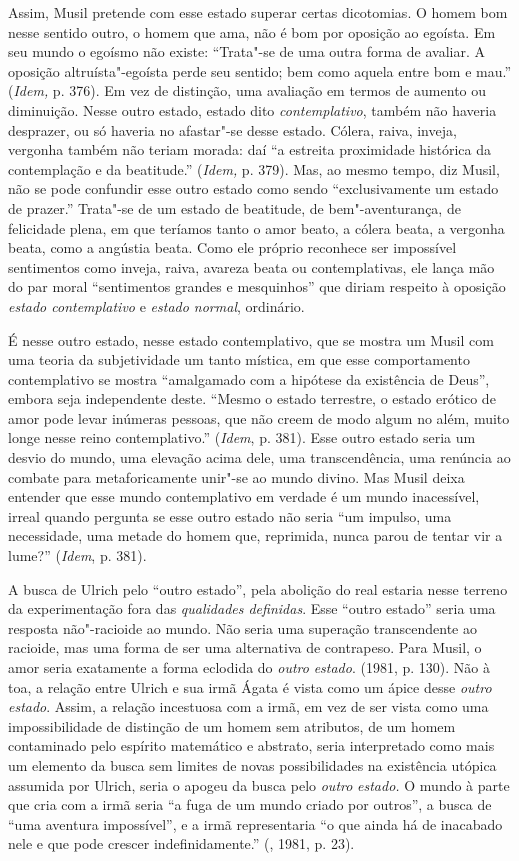 Assim, Musil pretende com esse estado superar certas dicotomias. O homem
bom nesse sentido outro, o homem que ama, não é bom por oposição ao
egoísta. Em seu mundo o egoísmo não existe: ``Trata"-se de uma outra
forma de avaliar. A oposição altruísta"-egoísta perde seu sentido; bem
como aquela entre bom e mau.'' (\emph{Idem,} p. 376). Em vez de
distinção, uma avaliação em termos de aumento ou diminuição. Nesse outro
estado, estado dito \emph{contemplativo}, também não haveria desprazer,
ou só haveria no afastar"-se desse estado. Cólera, raiva, inveja,
vergonha também não teriam morada: daí ``a estreita proximidade
histórica da contemplação e da beatitude.'' (\emph{Idem,} p. 379). Mas,
ao mesmo tempo, diz Musil, não se pode confundir esse outro estado como
sendo ``exclusivamente um estado de prazer.'' Trata"-se de um estado de
beatitude, de bem"-aventurança, de felicidade plena, em que teríamos
tanto o amor beato, a cólera beata, a vergonha beata, como a angústia
beata. Como ele próprio reconhece ser impossível sentimentos como
inveja, raiva, avareza beata ou contemplativas, ele lança mão do par
moral ``sentimentos grandes e mesquinhos'' que diriam respeito à
oposição \emph{estado contemplativo} e \emph{estado normal}, ordinário.

É nesse outro estado, nesse estado contemplativo, que se mostra um Musil
com uma teoria da subjetividade um tanto mística, em que esse
comportamento contemplativo se mostra ``amalgamado com a hipótese da
existência de Deus'', embora seja independente deste. ``Mesmo o estado
terrestre, o estado erótico de amor pode levar inúmeras pessoas, que não
creem de modo algum no além, muito longe nesse reino contemplativo.''
(\emph{Idem}, p. 381). Esse outro estado seria um desvio do mundo, uma
elevação acima dele, uma transcendência, uma renúncia ao combate para
metaforicamente unir"-se ao mundo divino. Mas Musil deixa entender que
esse mundo contemplativo em verdade é um mundo inacessível, irreal
quando pergunta se esse outro estado não seria ``um impulso, uma
necessidade, uma metade do homem que, reprimida, nunca parou de tentar
vir a lume?'' (\emph{Idem}, p. 381).

A busca de Ulrich pelo ``outro estado'', pela abolição do real estaria
nesse terreno da experimentação fora das \emph{qualidades definidas}.
Esse ``outro estado'' seria uma resposta não"-racioide ao mundo. Não
seria uma superação transcendente ao racioide, mas uma forma de ser uma
alternativa de contrapeso. Para Musil, o amor seria exatamente a forma
eclodida do \emph{outro} \emph{estado}. (1981, p. 130). Não à toa, a
relação entre Ulrich e sua irmã Ágata é vista como um ápice desse
\emph{outro estado}. Assim, a relação incestuosa com a irmã, em vez de
ser vista como uma impossibilidade de distinção de um homem sem
atributos, de um homem contaminado pelo espírito matemático e abstrato,
seria interpretado como mais um elemento da busca sem limites de novas
possibilidades na existência utópica assumida por Ulrich, seria o apogeu
da busca pelo \emph{outro} \emph{estado.} O mundo à parte que cria com a
irmã seria ``a fuga de um mundo criado por outros'', a busca de ``uma
aventura impossível'', e a irmã representaria ``o que ainda há de
inacabado nele e que pode crescer indefinidamente.'' (, 1981, p.
23).

